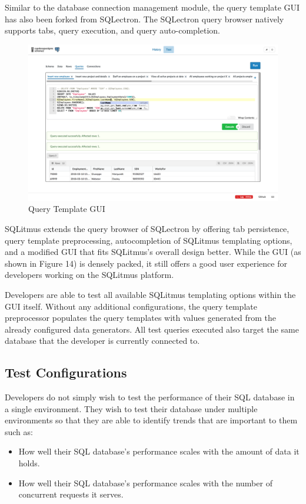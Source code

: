 \documentclass[12pt]{article}
\begin{document}
\begin{spacing}{1.9}
	Similar to the database connection management module, the query template GUI has also been forked from SQLectron. The SQLectron query browser natively supports tabs, query execution, and query auto-completion.
	
	\begin{figure}[H]
		\centering
		\includegraphics[width=\textwidth]{3-3-2.png}
		\caption{Query Template GUI }
		
	\end{figure}
	
	SQLitmus extends the query browser of SQLectron by offering tab persistence, query template preprocessing, autocompletion of SQLitmus templating options, and a modified GUI that fits SQLitmus's overall design better. While the GUI (as shown in Figure 14) is densely packed, it still offers a good user experience for developers working on the SQLitmus platform.
	
	Developers are able to test all available SQLitmus templating options within the GUI itself. Without any additional configurations, the query template preprocessor populates the query templates with values generated from the already configured data generators. All test queries executed also target the same database that the developer is currently connected to.
	
	
	\subsection{Test Configurations}
	
	Developers do not simply wish to test the performance of their SQL database in a single environment. They wish to test their database under multiple environments so that they are able to identify trends that are important to them such as:
	\begin{itemize}
		\item How well their SQL database's performance scales with the amount of data it holds.
		\item How well their SQL database's performance scales with the number of concurrent requests it serves.
	\end{itemize}
	

\end{spacing}
\end{document}

